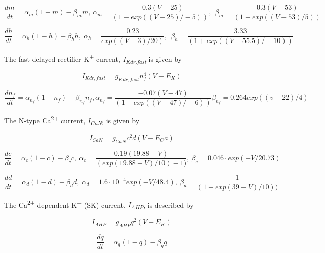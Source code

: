 \documentclass[12pt]{article}
\begin{document}
\begin{equation}
\frac{dm}{dt}=\alpha_m(1-m)-\beta_mm, \ 
\alpha_m=\frac{-0.3(V-25)}{(1-exp((V-25)/-5))}, \ \  \beta_m=\frac{0.3(V-53)}{(1-exp((V-53)/5))} \ 
\end{equation}

\begin{equation}
\frac{dh}{dt}=\alpha_h(1-h)-\beta_hh, \ 
\alpha_h=\frac{0.23}{exp((V-3)/20)}, \ \  \beta_h=\frac{3.33}{(1+exp((V-55.5)/-10))}\ \ \ 
\end{equation}


The fast delayed rectifier K\textsuperscript{+} current, \textit{I}\textit{\textsubscript{Kdr,fast}} is given by\ \ 


\begin{equation}
I_{Kdr, fast}=g_{Kdr, fast}n_f^4(V-E_K)
\end{equation}

\begin{equation}
\frac{dn_f}{dt}=\alpha_{n_f}(1-n_f)-\beta_{n_f}n_f , 
\alpha_{n_f}=\frac{-0.07(V-47)}{(1-exp((V-47)/-6))}  \beta_{n_f}=0.264exp((v-22)/4)
\end{equation}


The N-type Ca\textsuperscript{2+} current, \textit{I}\textit{\textsubscript{CaN}}, is given by


\begin{equation}
I_{CaN}=g_{CaN}c^2d(V-E_Ca)
\end{equation}

\begin{equation}
\frac{dc}{dt}=\alpha_c(1-c)-\beta_cc , \ 
\alpha_c=\frac{0.19(19.88-V)}{(exp(19.88-V)/10)-1)}, \  \beta_c=0.046 \cdot exp(-V/20.73)
\end{equation}

\begin{equation}
\frac{dd}{dt} = \alpha_d(1-d)-\beta_dd , \ \alpha_d=1.6\cdot
10^{-4}exp(-V/48.4) , \  \beta_d=\frac 1{(1+exp(39-V)/10))}
\end{equation}


The Ca\textsuperscript{2+}-dependent K\textsuperscript{+} (SK) current, \textit{I}\textit{\textsubscript{AHP}}, is
described by


\begin{equation}
I_{AHP} = g_{AHP} q^2 (V-E_K)
\end{equation}

\begin{equation}
\frac{dq}{dt}=\alpha_q(1-q)-\beta_qq
\end{equation}
\end{document}
